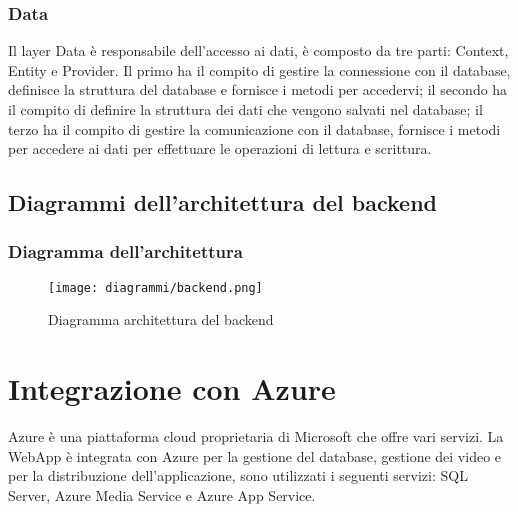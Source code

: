 \subsubsection{Data}
Il layer Data è responsabile dell'accesso ai dati, è composto da tre parti: Context, Entity e Provider. Il primo ha il compito di gestire la connessione con il database, definisce la struttura del database e fornisce i metodi per accedervi; il secondo ha il compito di definire la struttura dei dati che vengono salvati nel database; il terzo ha il compito di gestire la comunicazione con il database, fornisce i metodi per accedere ai dati per effettuare le operazioni di lettura e scrittura.\\

\subsection{Diagrammi dell'architettura del backend}
\subsubsection{Diagramma dell'architettura}
\begin{figure}[H] 
    \centering 
    \texttt{[image: diagrammi/backend.png]} 
    \caption{Diagramma architettura del backend}
\end{figure}

\section{Integrazione con Azure}
Azure è una piattaforma cloud proprietaria di Microsoft che offre vari servizi.
La WebApp è integrata con Azure per la gestione del database, gestione dei video e per la distribuzione dell'applicazione, sono utilizzati i seguenti servizi: SQL Server, Azure Media Service e Azure App Service.\\

